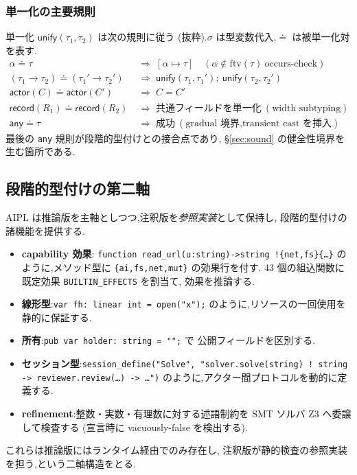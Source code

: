 \documentclass[11pt,a4paper]{article}
\newcommand{\code}[1]{\texttt{\small #1}}
\begin{document}
\subsubsection{単一化の主要規則}
単一化 $\mathsf{unify}(\tau_1,\tau_2)$ は次の規則に従う
(抜粋).$\sigma$ は型変数代入,$\doteq$ は被単一化対を表す.
\begin{align*}
\alpha \doteq \tau &\;\Rightarrow\; [\alpha \mapsto \tau]\quad
  (\alpha \notin \mathrm{ftv}(\tau)\ \text{occurs-check}) \\
(\tau_1 \to \tau_2) \doteq (\tau_1' \to \tau_2') &\;\Rightarrow\;
  \mathsf{unify}(\tau_1,\tau_1');\ \mathsf{unify}(\tau_2,\tau_2') \\
\mathsf{actor}(C) \doteq \mathsf{actor}(C') &\;\Rightarrow\;
  C = C' \\
\mathsf{record}(R_1) \doteq \mathsf{record}(R_2) &\;\Rightarrow\;
  \text{共通フィールドを単一化}\ (\text{width subtyping}) \\
\mathsf{any} \doteq \tau &\;\Rightarrow\;
  \text{成功}\ (\text{gradual 境界,transient cast を挿入})
\end{align*}
最後の \code{any} 規則が段階的型付けとの接合点であり,
\S\ref{sec:sound} の健全性境界を生む箇所である.

\subsection{段階的型付けの第二軸}\label{sec:gradual}
AIPL は推論版を主軸としつつ,注釈版を\emph{参照実装}として保持し,
段階的型付けの諸機能を提供する.
\begin{itemize}[leftmargin=1.4em,itemsep=2pt]
  \item \textbf{capability 効果}:
        \code{function read\_url(u:string)->string !\{net,fs\}\{\dots\}}
        のように,メソッド型に \code{\{ai,fs,net,mut\}} の効果行を付す.
        43 個の組込関数に既定効果 \code{BUILTIN\_EFFECTS} を割当て,
        効果を推論する.
  \item \textbf{線形型}:\code{var fh: linear int = open("x");}
        のように,リソースの一回使用を静的に保証する.
  \item \textbf{所有}:\code{pub var holder: string = "";} で
        公開フィールドを区別する.
  \item \textbf{セッション型}:\code{session\_define("Solve", "solver.solve(string) ! string -> reviewer.review(\dots) -> \dots")}
        のように,アクター間プロトコルを動的に定義する.
  \item \textbf{refinement}:整数・実数・有理数に対する述語制約を
        SMT ソルバ Z3 へ委譲して検査する (宣言時に
        vacuously-false を検出する).
\end{itemize}
これらは推論版にはランタイム経由でのみ存在し,
注釈版が静的検査の参照実装を担う,という二軸構造をとる.
\end{document}
